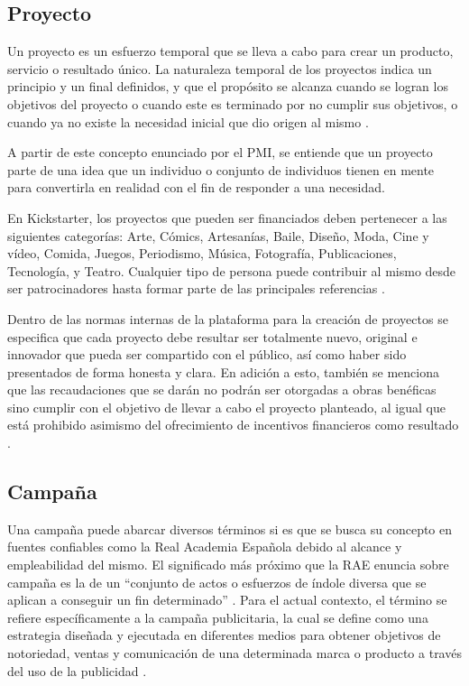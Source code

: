 \subsection{Proyecto}
Un proyecto es un esfuerzo temporal que se lleva a cabo para crear un producto, servicio o resultado único. La naturaleza temporal de los proyectos indica un principio y un final definidos, y que el propósito se alcanza cuando se logran los objetivos del proyecto o cuando este es terminado por no cumplir sus objetivos, o cuando ya no existe la necesidad inicial que dio origen al mismo \parencite{bk_pmi2017pmbokguide}.

A partir de este concepto enunciado por el PMI, se entiende que un proyecto parte de una idea que un individuo o conjunto de individuos tienen en mente para convertirla en realidad con el fin de responder a una necesidad.

En Kickstarter, los proyectos que pueden ser financiados deben pertenecer a las siguientes categorías: Arte, Cómics, Artesanías, Baile, Diseño, Moda, Cine y vídeo, Comida, Juegos, Periodismo, Música, Fotografía, Publicaciones, Tecnología, y Teatro. Cualquier tipo de persona puede contribuir al mismo desde ser patrocinadores hasta formar parte de las principales referencias \parencite{cr_kickstarter_learn}.

Dentro de las normas internas de la plataforma para la creación de proyectos se especifica que cada proyecto debe resultar ser totalmente nuevo, original e innovador que pueda ser compartido con el público, así como haber sido presentados de forma honesta y clara. En adición a esto, también se menciona que las recaudaciones que se darán no podrán ser otorgadas a obras benéficas sino cumplir con el objetivo de llevar a cabo el proyecto planteado, al igual que está prohibido asimismo del ofrecimiento de incentivos financieros como resultado \parencite{cr_kickstarter_rules}.


\subsection{Campaña}
Una campaña puede abarcar diversos términos si es que se busca su concepto en fuentes confiables como la Real Academia Española debido al alcance y empleabilidad del mismo. El significado más próximo que la RAE enuncia sobre campaña es la de un “conjunto de actos o esfuerzos de índole diversa que se aplican a conseguir un fin determinado” \parencite{gl_rae}. Para el actual contexto, el término se refiere específicamente a la campaña publicitaria, la cual se define como una estrategia diseñada y ejecutada en diferentes medios para obtener objetivos de notoriedad, ventas y comunicación de una determinada marca o producto a través del uso de la publicidad \parencite{tec_cyberclic_campaign}.

